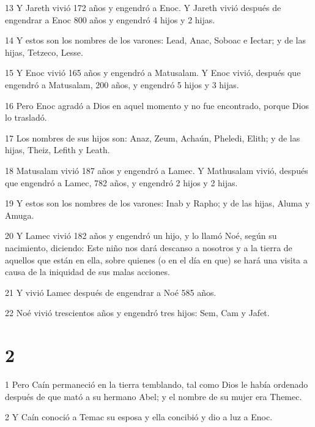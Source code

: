 \par 13 Y Jareth vivió 172 años y engendró a Enoc. Y Jareth vivió después de engendrar a Enoc 800 años y engendró 4 hijos y 2 hijas.

\par 14 Y estos son los nombres de los varones: Lead, Anac, Soboac e Iectar; y de las hijas, Tetzeco, Lesse.

\par 15 Y Enoc vivió 165 años y engendró a Matusalam. Y Enoc vivió, después que engendró a Matusalam, 200 años, y engendró 5 hijos y 3 hijas.

\par 16 Pero Enoc agradó a Dios en aquel momento y no fue encontrado, porque Dios lo trasladó.

\par 17 Los nombres de sus hijos son: Anaz, Zeum, Achaún, Pheledi, Elith; y de las hijas, Theiz, Lefith y Leath.

\par 18 Matusalam vivió 187 años y engendró a Lamec. Y Mathusalam vivió, después que engendró a Lamec, 782 años, y engendró 2 hijos y 2 hijas.

\par 19 Y estos son los nombres de los varones: Inab y Rapho; y de las hijas, Aluma y Amuga.

\par 20 Y Lamec vivió 182 años y engendró un hijo, y lo llamó Noé, según su nacimiento, diciendo: Este niño nos dará descanso a nosotros y a la tierra de aquellos que están en ella, sobre quienes (o en el día en que) se hará una visita a causa de la iniquidad de sus malas acciones.

\par 21 Y vivió Lamec después de engendrar a Noé 585 años.

\par 22 Noé vivió trescientos años y engendró tres hijos: Sem, Cam y Jafet.

\chapter{2}

\par 1 Pero Caín permaneció en la tierra temblando, tal como Dios le había ordenado después de que mató a su hermano Abel; y el nombre de su mujer era Themec.

\par 2 Y Caín conoció a Temac su esposa y ella concibió y dio a luz a Enoc.

